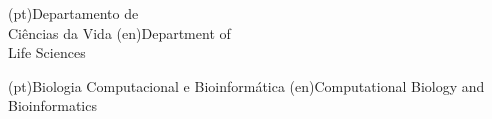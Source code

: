 \ntdepartment(pt){Departamento de\\Ciências da Vida}
\ntdepartment(en){Department of\\Life Sciences}

\ntdegreename(pt){Biologia Computacional e Bioinformática}
\ntdegreename(en){Computational Biology and Bioinformatics}
